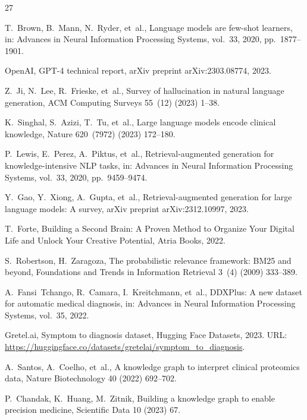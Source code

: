 \documentclass[preprint,12pt]{elsarticle}
\begin{document}
\begin{thebibliography}{27}

T.~Brown, B.~Mann, N.~Ryder, et~al., Language models are few-shot learners, in: Advances in Neural Information Processing Systems, vol.~33, 2020, pp.~1877--1901.

OpenAI, GPT-4 technical report, arXiv preprint arXiv:2303.08774, 2023.

Z.~Ji, N.~Lee, R.~Frieske, et~al., Survey of hallucination in natural language generation, ACM Computing Surveys 55~(12) (2023) 1--38.

K.~Singhal, S.~Azizi, T.~Tu, et~al., Large language models encode clinical knowledge, Nature 620~(7972) (2023) 172--180.

P.~Lewis, E.~Perez, A.~Piktus, et~al., Retrieval-augmented generation for knowledge-intensive NLP tasks, in: Advances in Neural Information Processing Systems, vol.~33, 2020, pp.~9459--9474.

Y.~Gao, Y.~Xiong, A.~Gupta, et~al., Retrieval-augmented generation for large language models: A survey, arXiv preprint arXiv:2312.10997, 2023.

T.~Forte, Building a Second Brain: A Proven Method to Organize Your Digital Life and Unlock Your Creative Potential, Atria Books, 2022.

S.~Robertson, H.~Zaragoza, The probabilistic relevance framework: BM25 and beyond, Foundations and Trends in Information Retrieval 3~(4) (2009) 333--389.

A.~Fansi~Tchango, R.~Camara, I.~Kreitchmann, et~al., DDXPlus: A new dataset for automatic medical diagnosis, in: Advances in Neural Information Processing Systems, vol.~35, 2022.

Gretel.ai, Symptom to diagnosis dataset, Hugging Face Datasets, 2023. URL: \url{https://huggingface.co/datasets/gretelai/symptom_to_diagnosis}.

A.~Santos, A.~Coelho, et~al., A knowledge graph to interpret clinical proteomics data, Nature Biotechnology 40 (2022) 692--702.

P.~Chandak, K.~Huang, M.~Zitnik, Building a knowledge graph to enable precision medicine, Scientific Data 10 (2023) 67.


\end{thebibliography}
\end{document}
